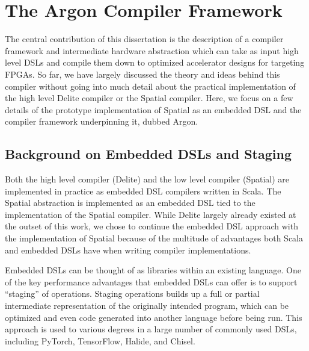 \chapter{The Argon Compiler Framework}
\label{argon}

The central contribution of this dissertation is the description of
a compiler framework and intermediate hardware abstraction which can
take as input high level DSLs and compile them down to optimized accelerator
designs for targeting FPGAs. So far, we have largely discussed the theory
and ideas behind this compiler without going into much detail about the practical
implementation of the high level Delite compiler or the Spatial compiler.
Here, we focus on a few details of the prototype implementation of Spatial
as an embedded DSL and the compiler framework underpinning it, dubbed Argon.

\section{Background on Embedded DSLs and Staging}
Both the high level compiler (Delite) and the low level compiler (Spatial)
are implemented in practice as embedded DSL compilers written in Scala. The Spatial
abstraction is implemented as an embedded DSL tied to the
implementation of the Spatial compiler.
While Delite largely already existed at the outset of this work, we chose to
continue the embedded DSL approach with the implementation of Spatial because of the
multitude of advantages both Scala and embedded DSLs have when writing compiler
implementations.

Embedded DSLs can be thought of as libraries within an existing language.
One of the key performance advantages that embedded DSLs can offer is to support
``staging'' of operations. Staging operations builds up a full or partial
intermediate representation of the originally intended program,
which can be optimized and even code generated into another language before being run.
This approach is used to various degrees in a large number of commonly used
DSLs, including PyTorch, TensorFlow, Halide, and Chisel.

